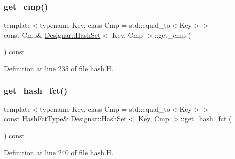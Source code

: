 \subsubsection{\texorpdfstring{get\+\_\+cmp()}{get\_cmp()}\hspace{0.1cm}{\footnotesize\ttfamily [2/2]}}
{\footnotesize\ttfamily template$<$typename Key, class Cmp = std\+::equal\+\_\+to$<$\+Key$>$$>$ \\
const Cmp\& \hyperlink{class_designar_1_1_hash_set}{Designar\+::\+Hash\+Set}$<$ Key, Cmp $>$\+::get\+\_\+cmp (\begin{DoxyParamCaption}{ }\end{DoxyParamCaption}) const\hspace{0.3cm}{\ttfamily [inline]}}



Definition at line 235 of file hash.\+H.

\mbox{\label{class_designar_1_1_hash_set_a4cc71f53416e8cde16b1f4a76d81c9ca}} 
\subsubsection{\texorpdfstring{get\+\_\+hash\+\_\+fct()}{get\_hash\_fct()}}
{\footnotesize\ttfamily template$<$typename Key, class Cmp = std\+::equal\+\_\+to$<$\+Key$>$$>$ \\
const \hyperlink{class_designar_1_1_hash_set_a05d8d111665c25bc17290c01fa299398}{Hash\+Fct\+Type}\& \hyperlink{class_designar_1_1_hash_set}{Designar\+::\+Hash\+Set}$<$ Key, Cmp $>$\+::get\+\_\+hash\+\_\+fct (\begin{DoxyParamCaption}{ }\end{DoxyParamCaption}) const\hspace{0.3cm}{\ttfamily [inline]}}



Definition at line 240 of file hash.\+H.

\mbox{\label{class_designar_1_1_hash_set_a5bb190c4e06ee28394adb03d51cc9607}} 
